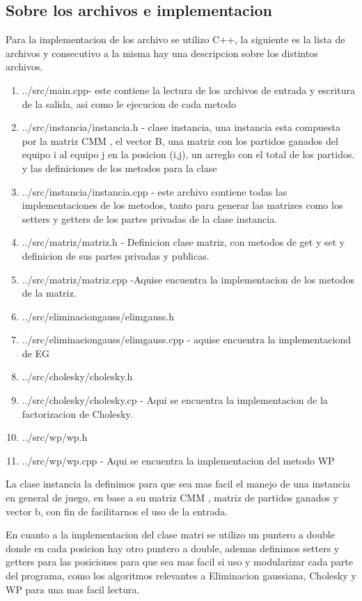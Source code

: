 \subsection{Sobre los archivos e implementacion}

Para la implementacion de los archivo se utilizo C++, la siguiente es la lista de archivos y consecutivo a la misma hay una descripcion sobre los distintos archivos.

\begin{enumerate}
\item ../src/main.cpp- este contiene la lectura de los archivos de entrada y escritura de la salida, asi como le ejecucion de cada metodo
\item ../src/instancia/instancia.h - clase instancia, una instancia esta compuesta por la matriz CMM , el vector B, una matriz con los partidos ganados del equipo i al equipo j en la posicion (i,j), un arreglo con el total de los partidos. y las definiciones de los metodos para la clase
\item ../src/instancia/instancia.cpp - este archivo contiene todas las implementaciones de los metodos, tanto para generar las matrizes  como los setters y getters de los partes privadas de la clase instancia. 
\item ../src/matriz/matriz.h - Definicion clase matriz, con metodos de get y set y definicion de sus partes privadas y publicas.
\item ../src/matriz/matriz.cpp -Aquise encuentra la implementacion de los metodos de la matriz.
\item ../src/eliminaciongauss/elimgauss.h 
\item ../src/eliminaciongauss/elimgauss.cpp - aquise encuentra la implementaciond de EG
\item ../src/cholesky/cholesky.h 
\item ../src/cholesky/cholesky.cp  - Aqui se encuentra la implementacion de la factorizacion de Cholesky.
\item ../src/wp/wp.h
\item ../src/wp/wp.cpp - Aqui se encuentra la implementacion del metodo WP
\end{enumerate}

La clase instancia la definimos para que sea mas facil el manejo de una instancia en general de juego, 
en base a su matriz CMM , matriz de partidos ganados y vector b, con fin de facilitarnos el uso de la entrada.

En cuanto a la implementacion del clase matri se utilizo un puntero a double donde en cada posicion hay otro puntero a double, 
ademas definimos setters y getters para las posiciones para que sea mas facil si uso y modularizar cada parte del programa, como los algoritmos relevantes a 
Eliminacion gaussiana, Cholesky y WP para una mas facil lectura.

